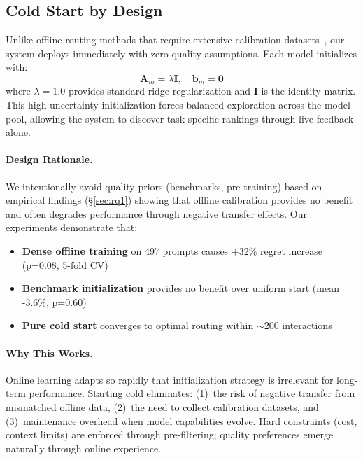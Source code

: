 \subsection{Cold Start by Design}
\label{sec:cold_start}

Unlike offline routing methods that require extensive calibration datasets~\cite{chen2023frugal,ong2024routellm}, our system deploys immediately with zero quality assumptions. Each model initializes with:
\begin{equation}
\mathbf{A}_m = \lambda \mathbf{I}, \quad \mathbf{b}_m = \mathbf{0}
\end{equation}
where $\lambda=1.0$ provides standard ridge regularization and $\mathbf{I}$ is the identity matrix. This high-uncertainty initialization forces balanced exploration across the model pool, allowing the system to discover task-specific rankings through live feedback alone.

\paragraph{Design Rationale.} We intentionally avoid quality priors (benchmarks, pre-training) based on empirical findings (\S\ref{sec:rq1}) showing that offline calibration provides no benefit and often degrades performance through negative transfer effects. Our experiments demonstrate that:
\begin{itemize}[leftmargin=*,nosep]
    \item \textbf{Dense offline training} on 497 prompts causes +32\% regret increase (p=0.08, 5-fold CV)
    \item \textbf{Benchmark initialization} provides no benefit over uniform start (mean -3.6\%, p=0.60)
    \item \textbf{Pure cold start} converges to optimal routing within $\sim$200 interactions
\end{itemize}

\paragraph{Why This Works.} Online learning adapts so rapidly that initialization strategy is irrelevant for long-term performance. Starting cold eliminates: (1)~the risk of negative transfer from mismatched offline data, (2)~the need to collect calibration datasets, and (3)~maintenance overhead when model capabilities evolve. Hard constraints (cost, context limits) are enforced through pre-filtering; quality preferences emerge naturally through online experience.


